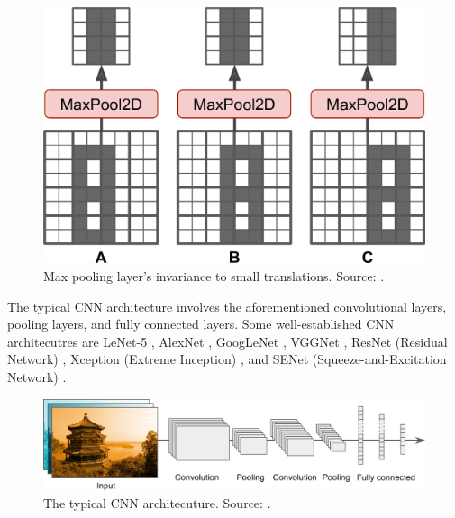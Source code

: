 \documentclass[a4paper,11pt,oneside]{article}
\begin{document}
  \begin{figure}[ht]
    \begin{center}
      \includegraphics[width=.8\textwidth]{max_pooling_invariance.png}
    \end{center}
    \caption{Max pooling layer's invariance to small translations. Source: \cite{geron2019hands}.}
  \end{figure}

  The typical CNN architecture involves the aforementioned convolutional layers, pooling layers, and fully connected layers.
  Some well-established CNN architecutres are LeNet-5 \cite{lecun1998gradient}, AlexNet \cite{krizhevsky2012imagenet},
  GoogLeNet \cite{szegedy2015going}, VGGNet \cite{simonyan2014very}, ResNet (Residual Network) \cite{he2016deep}, Xception
  (Extreme Inception) \cite{chollet2017xception}, and SENet (Squeeze-and-Excitation Network) \cite{hu2018squeeze}.

  \begin{figure}[ht]
    \begin{center}
      \includegraphics[width=.8\textwidth]{typical_cnn.png}
    \end{center}
    \caption{The typical CNN architecuture. Source: \cite{geron2019hands}.}
  \end{figure}
\end{document}
